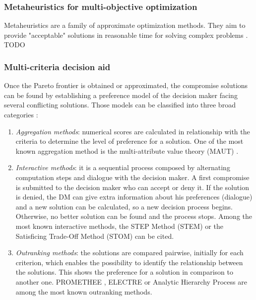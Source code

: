 \subsubsection{Metaheuristics for multi-objective optimization}
Metaheuristics are a family of approximate optimization methods. They aim to provide "acceptable" solutions in reasonable time for solving complex problems \cite{talbi09}.\\
TODO

\subsubsection{Multi-criteria decision aid}
Once the Pareto frontier is obtained or approximated, the compromise solutions can be found by establishing a preference model of the decision maker facing several conflicting solutions. Those models can be classified into three broad categories \cite{Vin92, beltstew}:

\begin{enumerate}
\item \textit{Aggregation methods}: numerical scores are calculated in relationship with the criteria to determine the level of preference for a solution. One of the most known aggregation method is the multi-attribute value theory (MAUT) \cite{MMAUT}.
\item \textit{Interactive methods}: it is a sequential process composed by alternating computation steps and dialogue with the decision maker. A first compromise is submitted to the decision maker who can accept or deny it. If the solution is denied, the DM can give extra information about his preferences (dialogue) and a new solution can be calculated, so a new decision process begins. Otherwise, no better solution can be found and the process stops. Among the most known interactive methods, the STEP Method (STEM) \cite{benayoun71} or the Satisficing Trade-Off Method (STOM) \cite{nakayama84} can be cited.
\item \textit{Outranking methods}: the solutions are compared pairwise, initially for each criterion, which enables the possibility to identify the relationship between the solutions. This shows the preference for a solution in comparison to another one. PROMETHEE \cite{Brans1}, ELECTRE \cite{Roy66} or Analytic Hierarchy Process \cite{MAHP} are among the most known outranking methods.
\end{enumerate}


